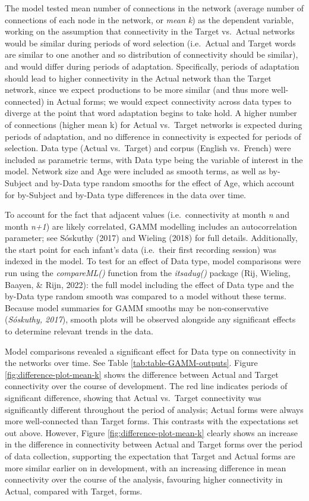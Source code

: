 \documentclass[
  man]{apa6}
\begin{document}
The model tested mean number of connections in the network (average number of connections of each node in the network, or \emph{mean k}) as the dependent variable, working on the assumption that connectivity in the Target vs.~Actual networks would be similar during periods of word selection (i.e.~Actual and Target words are similar to one another and so distribution of connectivity should be similar), and would differ during periods of adaptation. Specifically, periods of adaptation should lead to higher connectivity in the Actual network than the Target network, since we expect productions to be more similar (and thus more well-connected) in Actual forms; we would expect connectivity across data types to diverge at the point that word adaptation begins to take hold. A higher number of connections (higher mean k) for Actual vs.~Target networks is expected during periods of adaptation, and no difference in connectivity is expected for periods of selection. Data type (Actual vs.~Target) and corpus (English vs.~French) were included as parametric terms, with Data type being the variable of interest in the model. Network size and Age were included as smooth terms, as well as by-Subject and by-Data type random smooths for the effect of Age, which account for by-Subject and by-Data type differences in the data over time.

To account for the fact that adjacent values (i.e.~connectivity at month \emph{n} and month \emph{n+1}) are likely correlated, GAMM modelling includes an autocorrelation parameter; see Sóskuthy (2017) and Wieling (2018) for full details. Additionally, the start point for each infant's data (i.e.~their first recording session) was indexed in the model. To test for an effect of Data type, model comparisons were run using the \emph{compareML()} function from the \emph{itsadug()} package (Rij, Wieling, Baayen, \& Rijn, 2022): the full model including the effect of Data type and the by-Data type random smooth was compared to a model without these terms. Because model summaries for GAMM smooths may be non-conservative (\emph{Sóskuthy, 2017}), smooth plots will be observed alongside any significant effects to determine relevant trends in the data.

Model comparisons revealed a significant effect for Data type on connectivity in the networks over time. See Table \ref{tab:table-GAMM-outputs}. Figure \ref{fig:difference-plot-mean-k} shows the difference between Actual and Target connectivity over the course of development. The red line indicates periods of significant difference, showing that Actual vs.~Target connectivity was significantly different throughout the period of analysis; Actual forms were always more well-connected than Target forms. This contrasts with the expectations set out above. However, Figure \ref{fig:difference-plot-mean-k} clearly shows an increase in the difference in connectivity between Actual and Target forms over the period of data collection, supporting the expectation that Target and Actual forms are more similar earlier on in development, with an increasing difference in mean connectivity over the course of the analysis, favouring higher connectivity in Actual, compared with Target, forms.
\end{document}
